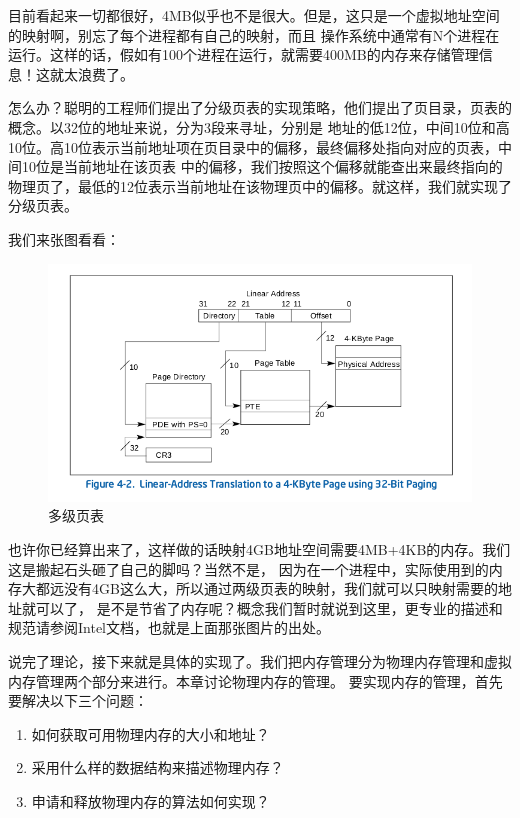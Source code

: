 \par 目前看起来一切都很好，4MB似乎也不是很大。但是，这只是一个虚拟地址空间的映射啊，别忘了每个进程都有自己的映射，而且\allowbreak
操作系统中通常有N个进程在运行。这样的话，假如有100个进程在运行，就需要400MB的内存来存储管理信息！这就太浪费了。

\par 怎么办？聪明的工程师们提出了分级页表的实现策略，他们提出了页目录，页表的概念。以32位的地址来说，分为3段来寻址，分别是\allowbreak
地址的低12位，中间10位和高10位。高10位表示当前地址项在页目录中的偏移，最终偏移处指向对应的页表，中间10位是当前地址在该页表\allowbreak
中的偏移，我们按照这个偏移就能查出来最终指向的物理页了，最低的12位表示当前地址在该物理页中的偏移。就这样，我们就实现了分级页表。

\par 我们来张图看看：

\begin{figure}[H]
      \centering
      \includegraphics[scale=0.5]{picture/chapt9/PAGE.png}
      \caption{多级页表}
\end{figure}

\par 也许你已经算出来了，这样做的话映射4GB地址空间需要4MB+4KB的内存。我们这是搬起石头砸了自己的脚吗？当然不是，\allowbreak
因为在一个进程中，实际使用到的内存大都远没有4GB这么大，所以通过两级页表的映射，我们就可以只映射需要的地址就可以了，\allowbreak
是不是节省了内存呢？概念我们暂时就说到这里，更专业的描述和规范请参阅Intel文档，也就是上面那张图片的出处。

\par 说完了理论，接下来就是具体的实现了。我们把内存管理分为物理内存管理和虚拟内存管理两个部分来进行。本章讨论物理内存的管理。\allowbreak
要实现内存的管理，首先要解决以下三个问题：

\begin{mdframed}
	\begin{enumerate}
		\item 如何获取可用物理内存的大小和地址？
		\item 采用什么样的数据结构来描述物理内存？
		\item 申请和释放物理内存的算法如何实现？
	\end{enumerate}
\end{mdframed}

